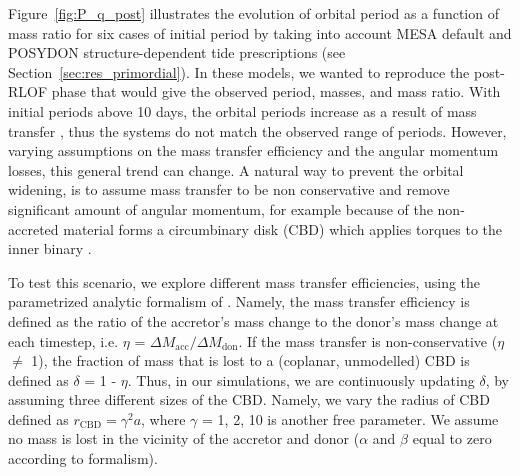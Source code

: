 \documentclass{aa}
\DeclareRobustCommand{\Figref}[1]{Figure~\ref{#1}}
\DeclareRobustCommand{\Secref}[1]{Section~\ref{#1}}
\begin{document}
\Figref{fig:P_q_post} illustrates the evolution of orbital period as a
function of mass ratio for six cases of initial period by taking into
account MESA default and POSYDON structure-dependent tide
prescriptions (see \Secref{sec:res_primordial}). In these models,
we wanted to reproduce the post-RLOF phase that would give the
observed period, masses, and mass ratio. With initial periods
above 10 days,
the orbital periods increase as a result of mass transfer
\citep[e.g.,][]{Renzo_2019runaways}, thus the systems do not match the
observed range of periods.
However, varying assumptions on the
  mass transfer efficiency and the angular momentum losses, this
  general trend can change. 
 A natural way to prevent the orbital widening, is to assume mass transfer to be non
conservative and remove significant amount of angular momentum, for
example because of the non-accreted material forms a circumbinary disk
(CBD) which applies torques to the inner binary \citep[see e.g.,][]{Vanbeveren_1982,Shao_2016}.

To test this scenario, we explore different mass transfer efficiencies,
using the parametrized analytic formalism of \citet{Soberman_1997}. 
Namely, the mass transfer efficiency is defined as the ratio
of the accretor's mass change to the donor's mass change at each timestep, i.e. $\eta$ = $\Delta M_\mathrm{acc}/\Delta M_\mathrm{don}$.
If the mass transfer is non-conservative ($\eta$ $\neq$ 1), the fraction of mass
that is lost to a (coplanar, unmodelled) CBD is defined as $\delta$ = 1 - $\eta$.
Thus, in our simulations, we are continuously updating $\delta$, by assuming three different sizes of the CBD.
Namely, we vary the radius of CBD defined as $r_\mathrm{CBD} = \gamma^2 a$, where $\gamma$ = 1, 2, 10 is another free parameter.
We assume no mass is lost in the vicinity of the accretor and donor ($\alpha$ and $\beta$ equal to zero according to \citealt{Soberman_1997} formalism).
\end{document}
